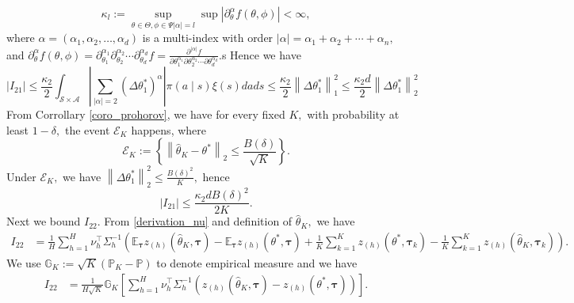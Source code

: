 \documentclass{article}
\numberwithin{equation}{section}
\theoremstyle{plain}
\theoremstyle{definition}
\theoremstyle{remark}
\begin{document}
\begin{equation*}
    \kappa_{l}:=\sup _{\theta \in \Theta, \phi \in \Psi|\alpha|=l} \sup \left|\partial_{\theta}^{\alpha} f(\theta, \phi)\right|<\infty,
\end{equation*}
where $\alpha=\left(\alpha_{1}, \alpha_{2}, \ldots, \alpha_{d}\right)$ is a multi-index with order $|\alpha|=\alpha_{1}+\alpha_{2}+\cdots+\alpha_{n},$ and $\partial^{\alpha}_{\theta} f(\theta,\phi) = \partial_{\theta_1}^{\alpha_{1}} \partial_{\theta_2}^{\alpha_{2}} \cdots \partial_{\theta_d}^{\alpha_{d}} f=\frac{\partial^{|\alpha|} f}{\partial \theta_{1}^{\alpha_{1}} \partial \theta_{2}^{\alpha_{2}} \cdots \partial \theta_{d}^{\alpha_{d}}}.$s Hence we have
\begin{equation*}
    \left| I_{21} \right| \leq \frac{\kappa_2}{2} \int_{\mathcal{S} \times \mathcal{A}} \left|\sum_{\left|\alpha\right| = 2} \left(\Delta \theta_1^* \right)^{\alpha}\right| \pi(a \mid s) \xi(s) d a d s \leq \frac{\kappa_2}{2} \left\|\Delta \theta_1^*\right\|_1^2 \leq \frac{\kappa_2 d}{2} \left\|\Delta \theta_1^*\right\|_2^2
\end{equation*}
From Corrollary \ref{coro_prohorov}, we have for every fixed $K,$ with probability at least $1 - \delta,$ the event $\mathcal{E}_K$ happens, where
$$
\mathcal{E}_K := \left\{\left\|\widehat{\theta}_K - \theta^*\right\|_2 \leq \frac{B(\delta)}{\sqrt{K}}\right\}.
$$
Under $\mathcal{E}_K,$ we have $\left\|\Delta \theta_1^*\right\|_2^2 \leq \frac{B(\delta)^2}{K},$ hence
$$\left|I_{21}\right| \leq \frac{\kappa_2 d B(\delta)^2}{2 K}.$$
Next we bound $I_{22}.$ From \eqref{derivation_nu} and definition of $\widehat{\theta}_K,$ we have
\begin{align*}
    I_{22}
    & = \frac{1}{H} \sum_{h=1}^H \nu_h^{\top} \Sigma_h^{-1} \left(\mathbb{E}_{\boldsymbol{\tau}} z_{(h)}\left(\widehat{\theta}_{K}, \boldsymbol{\tau}\right) - \mathbb{E}_{\boldsymbol{\tau}} z_{(h)}\left(\theta^*, \boldsymbol{\tau}\right) +\frac{1}{K} \sum_{k=1}^{K} z_{(h)}\left(\theta^{*}, \boldsymbol{\tau}_{k}\right) - \frac{1}{K} \sum_{k=1}^{K} z_{(h)}\left(\widehat{\theta}_K, \boldsymbol{\tau}_{k}\right) \right).
\end{align*}
We use $\mathbb{G}_K := \sqrt{K}\left(\mathbb{P}_K - \mathbb{P}\right)$ to denote empirical measure and we have
\begin{align*}
    I_{22}
    & = \frac{1}{H\sqrt{K}} \mathbb{G}_K \left[\sum_{h=1}^H \nu_h^{\top} \Sigma_h^{-1} \left(z_{(h)}\left(\widehat{\theta}_{K}, \boldsymbol{\tau}\right) - z_{(h)}\left(\theta^*, \boldsymbol{\tau}\right)\right)\right].
\end{align*}
\end{document}
